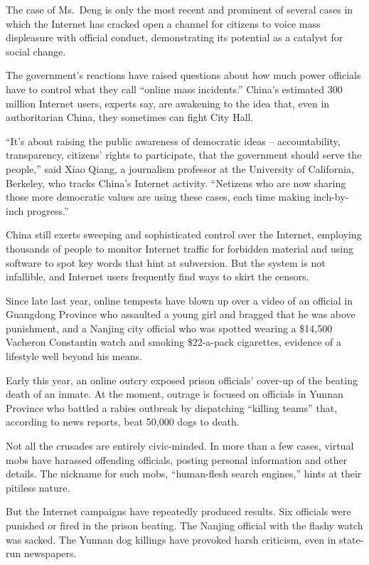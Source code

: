 ﻿\documentclass[12pt,a4paper,onecolumn]{article}
\begin{document}
The case of Ms.~Deng is only the most recent and prominent of several cases in which the Internet
has cracked open a channel for citizens to voice mass displeasure with official conduct,
demonstrating its potential as a catalyst for social change.

The government's reactions have raised questions about how much power officials have to control what
they call ``online mass incidents.'' China's estimated 300 million Internet users, experts say, are
awakening to the idea that, even in authoritarian China, they sometimes can fight City Hall.

``It's about raising the public awareness of democratic ideas -- accountability, transparency,
citizens' rights to participate, that the government should serve the people,'' said Xiao Qiang, a
journalism professor at the University of California, Berkeley, who tracks China's Internet
activity. ``Netizens who are now sharing those more democratic values are using these cases, each
time making inch-by-inch progress.''

China still exerts sweeping and sophisticated control over the Internet, employing thousands of
people to monitor Internet traffic for forbidden material and using software to spot key words that
hint at subversion. But the system is not infallible, and Internet users frequently find ways to
skirt the censors.

Since late last year, online tempests have blown up over a video of an official in Guangdong
Province who assaulted a young girl and bragged that he was above punishment, and a Nanjing city
official who was spotted wearing a \$14,500 Vacheron Constantin watch and smoking \$22-a-pack
cigarettes, evidence of a lifestyle well beyond his means.

Early this year, an online outcry exposed prison officials' cover-up of the beating death of an
inmate. At the moment, outrage is focused on officials in Yunnan Province who battled a rabies
outbreak by dispatching ``killing teams'' that, according to news reports, beat 50,000 dogs to
death.

Not all the crusades are entirely civic-minded. In more than a few cases, virtual mobs have harassed
offending officials, posting personal information and other details. The nickname for such mobs,
``human-flesh search engines,'' hints at their pitiless nature.

But the Internet campaigns have repeatedly produced results. Six officials were punished or fired in
the prison beating. The Nanjing official with the flashy watch was sacked. The Yunnan dog killings
have provoked harsh criticism, even in state-run newspapers.
\end{document}
